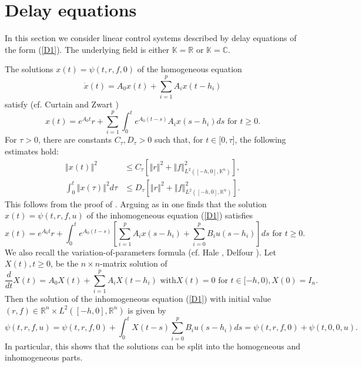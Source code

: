 \documentclass{siamltex}%
\begin{document}
\section{Delay equations\label{Section3}}

In this section we consider linear control systems described by delay
equations of the form (\ref{D1}). The underlying field is either
$\mathbb{K}=\mathbb{R}$ or $\mathbb{K}=\mathbb{C}$.

The solutions $x(t)=\psi(t,r,f,0)$ of the homogeneous equation%
\begin{equation}
\dot{x}(t)=A_{0}x(t)+\sum_{i=1}^{p}A_{i}x(t-h_{i}) \label{hom}%
\end{equation}
satisfy (cf. Curtain and Zwart \cite[Theorem 3.3.1]{CurtZ})%
\[
x(t)=e^{A_{0}t}r+\sum_{i=1}^{p}\int_{0}^{t}e^{A_{0}(t-s)}A_{i}x(s-h_{i}%
)ds\text{ for }t\geq0.
\]
For $\tau>0$, there are constants $C_{\tau},D_{\tau}>0$ such that, for
$t\in\lbrack0,\tau]$, the following estimates hold:%
\begin{align}
\left\Vert x(t)\right\Vert ^{2}  &  \leq C_{\tau}\left[  \left\Vert
r\right\Vert ^{2}+\left\Vert f\right\Vert _{L^{2}([-h,0],\mathbb{K}^{n})}%
^{2}\right]  ,\label{CZ_3.67}\\
\int_{0}^{t}\left\Vert x(\tau)\right\Vert ^{2}d\tau &  \leq D_{\tau}\left[
\left\Vert r\right\Vert ^{2}+\left\Vert f\right\Vert _{L^{2}([-h,0],\mathbb{K}%
^{n})}^{2}\right]  . \label{CZ_3.68}%
\end{align}
This follows from the proof of \cite[Lemma 3.3.3]{CurtZ}. Arguing as in
\cite[Theorem 3.3.1]{CurtZ} one finds that the solution $x(t)=\psi(t,r,f,u)$
of the inhomogeneous equation (\ref{D1}) satisfies%
\begin{equation}
x(t)=e^{A_{0}t}r+\int_{0}^{t}e^{A_{0}(t-s)}\left[  \sum_{i=1}^{p}%
A_{i}x(s-h_{i})+\sum_{i=0}^{p}B_{i}u(s-h_{i})\right]  ds\text{ for }t\geq0.
\label{x_inhom}%
\end{equation}
We also recall the variation-of-parameters formula (cf. Hale \cite[Chapter 6,
Theorem 2.1 and Corollary 2.1 on pp. 143-145]{Hale}, Delfour \cite[Theorem
1.2]{Delfour77}). Let $X(t),t\geq0$, be the $n\times n$-matrix solution of%
\[
\frac{d}{dt}X(t)=A_{0}X(t)+\sum_{i=1}^{p}A_{i}X(t-h_{i})\text{ with
}X(t)=0\text{ for }t\in\lbrack-h,0),X(0)=I_{n}.
\]
Then the solution of the inhomogeneous equation (\ref{D1}) with initial value
$(r,f)\in\mathbb{R}^{n}\times L^{2}([-h,0],\mathbb{R}^{n})$ is given by%
\begin{equation}
\psi(t,r,f,u)=\psi(t,r,f,0)+\int_{0}^{t}X(t-s)\sum_{i=0}^{p}B_{i}%
u(s-h_{i})ds=\psi(t,r,f,0)+\psi(t,0,0,u). \label{VdP}%
\end{equation}
In particular, this shows that the solutions can be split into the homogeneous
and inhomogeneous parts.
\end{document}
